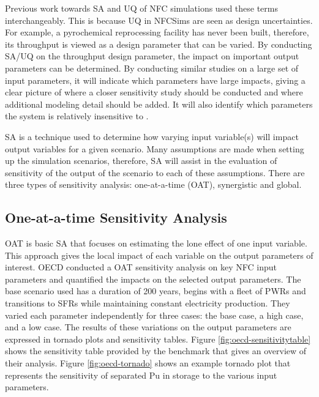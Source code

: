 Previous work towards \gls{SA} and \gls{UQ} of \gls{NFC} 
simulations used these terms interchangeably. 
This is because \gls{UQ} in \glspl{NFCSim} are seen as design 
uncertainties. 
For example, a pyrochemical reprocessing facility has never been 
built, therefore, its throughput is viewed as a design parameter 
that can be varied. 
By conducting \gls{SA}/\gls{UQ} on the throughput design 
parameter, the impact on important output parameters can be 
determined. 
By conducting similar studies on a large set of input parameters, 
it will indicate which parameters have large impacts, giving a clear 
picture of where a closer sensitivity study should be conducted and 
where additional modeling detail should be added. 
It will also identify which parameters the system is relatively 
insensitive to \cite{noauthor_effects_2017}. 

\gls{SA} is a technique used to determine how 
varying input variable(s) will impact
output variables for a given scenario. 
Many assumptions are made when setting up the simulation scenarios, 
therefore, \gls{SA} will assist in the evaluation of
sensitivity of the output of the scenario to each of these 
assumptions.  
There are three types of sensitivity analysis: one-at-a-time (OAT), 
synergistic and global. 

\subsection{One-at-a-time Sensitivity Analysis}
OAT is basic \gls{SA} that focuses on estimating the lone effect 
of one input variable. 
This approach gives the local impact of each variable on the 
output parameters of interest. 
OECD conducted a OAT sensitivity analysis \cite{noauthor_effects_2017} 
on key \gls{NFC} input parameters
and quantified the impacts on the selected output parameters. 
The base scenario used has a duration of 200 years, begins 
with a fleet of \glspl{PWR} and transitions to \glspl{SFR} while 
maintaining constant electricity production. 
They varied each parameter independently for three cases: 
the base case, a high case, and a low case. 
The results of these variations on the output parameters 
are expressed in tornado plots and sensitivity tables. 
Figure \ref{fig:oecd-sensitivitytable} shows the sensitivity table
provided by the benchmark that gives an overview of their analysis. 
Figure \ref{fig:oecd-tornado} shows an example tornado plot that represents 
the sensitivity of separated Pu in storage to the various input parameters. 

